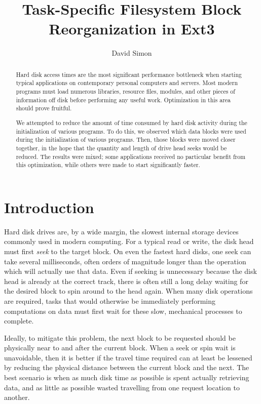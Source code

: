\documentclass[10pt,twocolumn,letterpaper]{article}
\author{David Simon}
\title{Task-Specific Filesystem Block Reorganization in Ext3}
\begin{document}
\maketitle

\begin{abstract}
Hard disk access times are the most significant performance bottleneck when
starting typical applications on contemporary personal computers and servers.
Most modern programs must load numerous libraries, resource files, modules, and
other pieces of information off disk before performing any useful work. Optimization
in this area should prove fruitful.

We attempted to reduce the amount of time consumed by hard disk activity during
the initialization of various programs. To do this, we observed which data blocks were
used during the initialization of various programs. Then, those blocks were moved
closer together, in the hope that the quantity and length of drive head seeks
would be reduced. The results were mixed; some applications received no particular
benefit from this optimization, while others were made to start significantly faster.
\end{abstract}

\section{Introduction}

Hard disk drives are, by a wide margin, the slowest internal storage devices commonly
used in modern computing. For a typical read or write, the disk head must first
\emph{seek} to the target block\cite{seektime}. On even the fastest hard disks\cite{deskstar}, one seek
can take several milliseconds, often orders of magnitude longer than the operation which will actually
use that data. Even if seeking is unnecessary because the disk head is already at the correct track, there is
often still a long delay waiting for the desired block to spin around to the head again\cite{latency}. When
many disk operations are required, tasks that would otherwise be immediately performing computations on data must first wait for these slow, mechanical processes to complete.

Ideally, to mitigate this problem, the next block to be requested should be physically near to
and after the current block\cite{autolocality}. When a seek or
spin wait is unavoidable, then it is better if the travel time required can at least be lessened by reducing the
physical distance between the current block and the next. The best scenario is when
as much disk time as possible is spent actually retrieving data, and as little as possible
wasted travelling from one request location to another.
\end{document}
